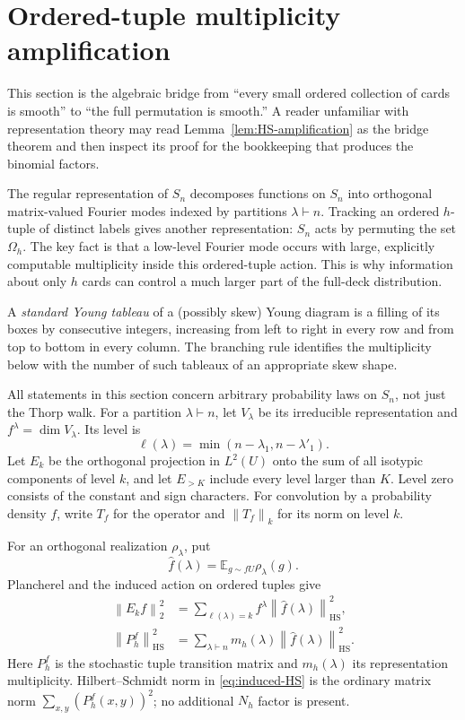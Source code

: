 \documentclass[11pt]{article}
\numberwithin{equation}{section}
\theoremstyle{definition}\newtheorem{definition}[theorem]{Definition}
\theoremstyle{remark}\newtheorem{remark}[theorem]{Remark}
\newcommand{\E}{\mathbb E}
\newcommand{\HS}{\mathrm{HS}}
\newcommand{\norm}[1]{\left\lVert#1\right\rVert}
\begin{document}
\section{Ordered-tuple multiplicity amplification}\label{sec:tuple-amplification}
This section is the algebraic bridge from ``every small ordered collection of
cards is smooth'' to ``the full permutation is smooth.''  A reader unfamiliar
with representation theory may read Lemma~\ref{lem:HS-amplification} as the
bridge theorem and then inspect its proof for the bookkeeping that produces
the binomial factors.

The regular representation of $S_n$ decomposes functions on $S_n$ into
orthogonal matrix-valued Fourier modes indexed by partitions $\lambda\vdash n$.
Tracking an ordered $h$-tuple of distinct labels gives another representation:
$S_n$ acts by permuting the set $\Omega_h$.  The key fact is that a low-level
Fourier mode occurs with large, explicitly computable multiplicity inside this
ordered-tuple action.  This is why information about only $h$ cards can control
a much larger part of the full-deck distribution.

A \emph{standard Young tableau} of a (possibly skew) Young diagram is a filling
of its boxes by consecutive integers, increasing from left to right in every
row and from top to bottom in every column.  The branching rule identifies the
multiplicity below with the number of such tableaux of an appropriate skew
shape.

All statements in this section concern arbitrary probability laws on
$S_n$, not just the Thorp walk. For a partition $\lambda\vdash n$, let
$V_\lambda$ be its irreducible representation and $f^\lambda=\dim V_\lambda$.
Its level is
\[
 \ell(\lambda)=\min(n-\lambda_1,n-\lambda'_1).
\]
Let $E_k$ be the orthogonal projection in $L^2(U)$ onto the sum of all
isotypic components of level $k$, and let $E_{>K}$ include every level
larger than $K$. Level zero consists of the constant and sign characters.
For convolution by a probability density $f$, write $T_f$ for the
operator and $\norm{T_f}_k$ for its norm on level $k$.

For an orthogonal realization $\rho_\lambda$, put
\[
 \widehat f(\lambda)=\E_{g\sim fU}\rho_\lambda(g).
\]
Plancherel and the induced action on ordered tuples give
\begin{align}
 \norm{E_k f}_2^2
 &=\sum_{\ell(\lambda)=k}f^\lambda
                 \norm{\widehat f(\lambda)}_\HS^2,\label{eq:plancherel}\\
 \norm{P_h^f}_\HS^2
 &=\sum_{\lambda\vdash n}m_h(\lambda)
                 \norm{\widehat f(\lambda)}_\HS^2.
 \label{eq:induced-HS}
\end{align}
Here $P_h^f$ is the stochastic tuple transition matrix and $m_h(\lambda)$
its representation multiplicity. Hilbert--Schmidt norm in
\eqref{eq:induced-HS} is the ordinary matrix norm
$\sum_{x,y}(P_h^f(x,y))^2$; no additional $N_h$ factor is present.
\end{document}
